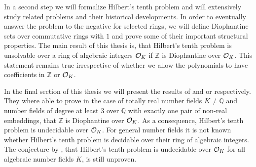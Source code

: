 In a second step we will formalize Hilbert's tenth problem and will extensively
study related problems and their historical developments. In order to eventually
answer the problem to the negative for selected rings, we will define
Diophantine sets over commutative rings with \(1\) and prove some of their
important structural properties. The main result of this thesis is, that
Hilbert's tenth problem is unsolvable over a ring of algebraic integers
\(\mathcal{O}_{K}\) if \(ℤ\) is Diophantine over \(\mathcal{O}_{K}\). This statement remains
true irrespective of whether we allow the polynomials to have coefficients in
\(ℤ\) or \(\mathcal{O}_{K}\).

In the final section of this thesis we will present the results of
\textcite{Denef1980} and \textcite{Pheidas1988} or \textcite{Shlapentokh1989}
respectively. They where able to prove in the case of totally real number fields
\(K ≠ ℚ\) and number fields of degree at least \(3\) over \(ℚ\) with exactly one
pair of non-real embeddings, that \(ℤ\) is Diophantine over \(\mathcal{O}_{K}\). As a
consequence, Hilbert's tenth problem is undecidable over \(\mathcal{O}_{K}\). For
general number fields it is not known whether Hilbert's tenth problem is
decidable over their ring of algebraic integers. The conjecture by
\textcite{Denef1978}, that Hilbert's tenth problem is undecidable over
\(\mathcal{O}_{K}\) for all algebraic number fields \(K\), is still unproven.
